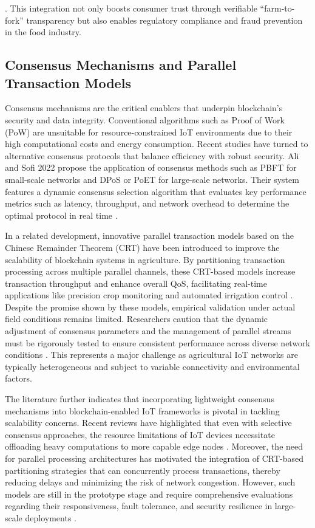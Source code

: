\documentclass[12pt,onecolumn]{IEEEtran} %
\begin{document}
\cite{demestichas2020blockchaininagriculture, bosona2023theroleof}. This integration not only boosts consumer trust through verifiable ``farm-to-fork'' transparency but also enables regulatory compliance and fraud prevention in the food industry.

\subsection*{ Consensus Mechanisms and Parallel Transaction Models}

Consensus mechanisms are the critical enablers that underpin blockchain's security and data integrity. Conventional algorithms such as Proof of Work (PoW) are unsuitable for resource-constrained IoT environments due to their high computational costs and energy consumption. Recent studies have turned to alternative consensus protocols that balance efficiency with robust security. Ali and Sofi 2022 propose the application of consensus methods such as PBFT for small-scale networks and DPoS or PoET for large-scale networks. Their system features a dynamic consensus selection algorithm that evaluates key performance metrics such as latency, throughput, and network overhead to determine the optimal protocol in real time \cite{ali2022blockchainenabledarchitecture}.

In a related development, innovative parallel transaction models based on the Chinese Remainder Theorem (CRT) have been introduced to improve the scalability of blockchain systems in agriculture. By partitioning transaction processing across multiple parallel channels, these CRT-based models increase transaction throughput and enhance overall QoS, facilitating real-time applications like precision crop monitoring and automated irrigation control \cite{ali2022blockchainenabledarchitecture}. Despite the promise shown by these models, empirical validation under actual field conditions remains limited. Researchers caution that the dynamic adjustment of consensus parameters and the management of parallel streams must be rigorously tested to ensure consistent performance across diverse network conditions \cite{ali2022blockchainenabledarchitecture}. This represents a major challenge as agricultural IoT networks are typically heterogeneous and subject to variable connectivity and environmental factors.

The literature further indicates that incorporating lightweight consensus mechanisms into blockchain-enabled IoT frameworks is pivotal in tackling scalability concerns. Recent reviews have highlighted that even with selective consensus approaches, the resource limitations of IoT devices necessitate offloading heavy computations to more capable edge nodes \cite{ali2022blockchainenabledarchitecture}. Moreover, the need for parallel processing architectures has motivated the integration of CRT-based partitioning strategies that can concurrently process transactions, thereby reducing delays and minimizing the risk of network congestion. However, such models are still in the prototype stage and require comprehensive evaluations regarding their responsiveness, fault tolerance, and security resilience in large-scale deployments \cite{ali2022blockchainenabledarchitecture}.
\end{document}
